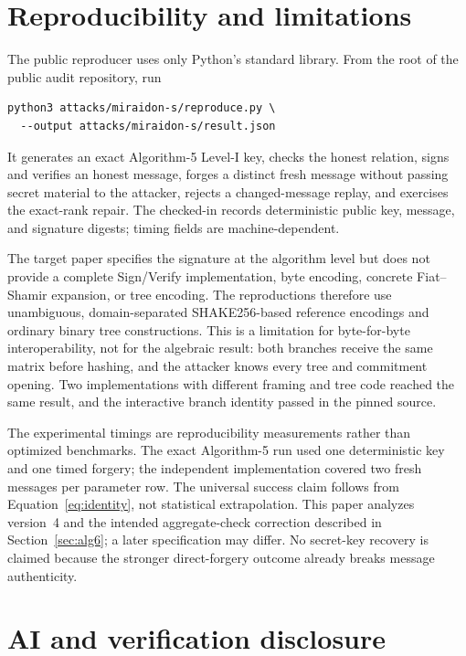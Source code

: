 \documentclass[10pt,a4paper]{article}
\begin{document}
\section{Reproducibility and limitations}
\label{sec:repro}

The public reproducer uses only Python's standard library.  From the root of
the public audit repository, run
\begin{verbatim}
python3 attacks/miraidon-s/reproduce.py \
  --output attacks/miraidon-s/result.json
\end{verbatim}
It generates an exact Algorithm-5 Level-I key, checks the honest relation,
signs and verifies an honest message, forges a distinct fresh message without
passing secret material to the attacker, rejects a changed-message replay,
and exercises the exact-rank repair.  The checked-in
 records deterministic public
key, message, and signature digests; timing fields are machine-dependent.

The target paper specifies the signature at the algorithm level but does not
provide a complete Sign/Verify implementation, byte encoding, concrete
Fiat--Shamir expansion, or tree encoding.  The reproductions therefore use
unambiguous, domain-separated SHAKE256-based reference encodings and ordinary
binary tree constructions.  This is a limitation for byte-for-byte
interoperability, not for the algebraic result: both branches receive the
same matrix before hashing, and the attacker knows every tree and commitment
opening.  Two implementations with different framing and tree code reached
the same result, and the interactive branch identity passed in the pinned
source.

The experimental timings are reproducibility measurements rather than
optimized benchmarks.  The exact Algorithm-5 run used one deterministic key
and one timed forgery; the independent implementation covered two fresh
messages per parameter row.  The universal success claim follows from
Equation~\eqref{eq:identity}, not statistical extrapolation.  This paper
analyzes version~4 and the intended aggregate-check correction described in
Section~\ref{sec:alg6}; a later specification may differ.  No secret-key
recovery is claimed because the stronger direct-forgery outcome already
breaks message authenticity.

\section{AI and verification disclosure}
\end{document}
